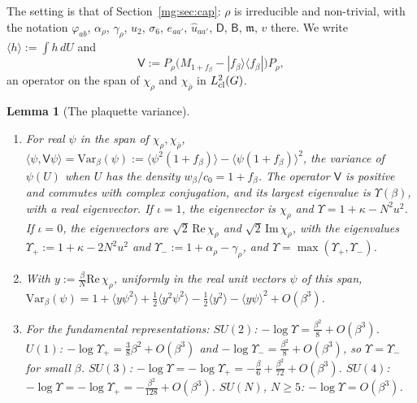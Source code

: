 \documentclass[11pt,a4paper]{article}
\newtheorem{lemma}[theorem]{Lemma}
\theoremstyle{definition}
\theoremstyle{remark}
\newcommand{\ip}[2]{\langle #1,#2\rangle}
\newcommand{\dU}{\,dU}
\begin{document}
The setting is that of Section~\ref{mg:sec:cap}: $\rho$ is irreducible and non-trivial, with the notation $\varphi_{ab}$, $\alpha_\rho$, $\gamma_\rho$,
$u_2$, $\sigma_6$, $e_{aa'}$, $\hat u_{aa'}$, $\mathsf D$, $\mathsf B$, $\mathfrak m$, $v$ there. We write $\langle h\rangle:=\int h\dU$ and
\[
\mathsf V:=P_\rho\bigl(M_{1+f_\beta}-|f_\beta\rangle\langle f_\beta|\bigr)P_\rho ,
\]
an operator on the span of $\chi_\rho$ and $\chi_{\bar\rho}$ in $L^2_{\rm cl}(G)$.

\begin{lemma}[The plaquette variance]\label{mg:lem:Upsilon}
\begin{enumerate}[label=(\roman*)]
\item For real $\psi$ in the span of $\chi_\rho,\chi_{\bar\rho}$, $\ip\psi{\mathsf V\psi}=\mathrm{Var}_\beta(\psi):=\langle\psi^2(1+f_\beta)\rangle-\langle\psi(1+f_\beta)\rangle^2$,
the variance of $\psi(U)$ when $U$ has the density $w_\beta/c_0=1+f_\beta$. The operator $\mathsf V$ is positive and commutes with complex
conjugation, and its largest eigenvalue is $\Upsilon(\beta)$, with a real eigenvector. If $\iota=1$, the eigenvector is $\chi_\rho$ and
$\Upsilon=1+\kappa-N^2u^2$. If $\iota=0$, the eigenvectors are $\sqrt2\,\mathrm{Re}\,\chi_\rho$ and $\sqrt2\,\mathrm{Im}\,\chi_\rho$, with the
eigenvalues $\Upsilon_+:=1+\kappa-2N^2u^2$ and $\Upsilon_-:=1+\alpha_\rho-\gamma_\rho$, and $\Upsilon=\max(\Upsilon_+,\Upsilon_-)$.
\item With $y:=\frac\beta N\mathrm{Re}\,\chi_\rho$, uniformly in the real unit vectors $\psi$ of this span,
$\mathrm{Var}_\beta(\psi)=1+\langle y\psi^2\rangle+\frac12\langle y^2\psi^2\rangle-\frac12\langle y^2\rangle-\langle y\psi\rangle^2+O(\beta^3)$.
\item For the fundamental representations: $SU(2)$: $-\log\Upsilon=\frac{\beta^2}8+O(\beta^3)$. $U(1)$: $-\log\Upsilon_+=\frac38\beta^2+O(\beta^3)$ and
$-\log\Upsilon_-=\frac{\beta^2}8+O(\beta^3)$, so $\Upsilon=\Upsilon_-$ for small $\beta$. $SU(3)$: $-\log\Upsilon=-\log\Upsilon_+=-\frac\beta6+\frac{\beta^2}{72}+O(\beta^3)$.
$SU(4)$: $-\log\Upsilon=-\log\Upsilon_+=-\frac{\beta^2}{128}+O(\beta^3)$. $SU(N)$, $N\ge5$: $-\log\Upsilon=O(\beta^3)$.
\end{enumerate}
\end{lemma}
\end{document}
